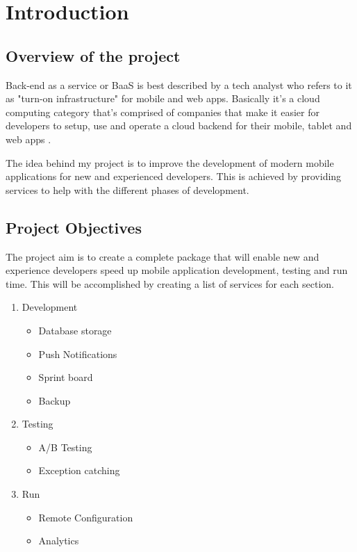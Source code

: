 \chapter{Introduction}

\section{Overview of the project}

Back-end as a service or BaaS is best described by a tech analyst who refers to it as "turn-on infrastructure" for mobile and web apps. Basically it's a cloud computing category that's comprised of companies that make it easier for developers to setup, use and operate a cloud backend for their mobile, tablet and web apps \cite{kinveywebsite}. 

The idea behind my project is to improve the development of modern mobile applications for new and experienced developers. This is achieved by providing services to help with the different phases of development. 


\section{Project Objectives}

The project aim is to create a complete package that will enable new and experience developers speed up mobile application development, testing and run time. This will be accomplished by creating a list of services for each section. 

\begin{enumerate}
  \item Development
    \begin{itemize}
        \item Database storage
        \item Push Notifications
        \item Sprint board
        \item Backup
    \end{itemize}
  \item Testing 
    \begin{itemize}
        \item A/B Testing
        \item Exception catching
    \end{itemize}
  \item Run
    \begin{itemize}
        \item Remote Configuration
        \item Analytics
    \end{itemize}
\end{enumerate}

